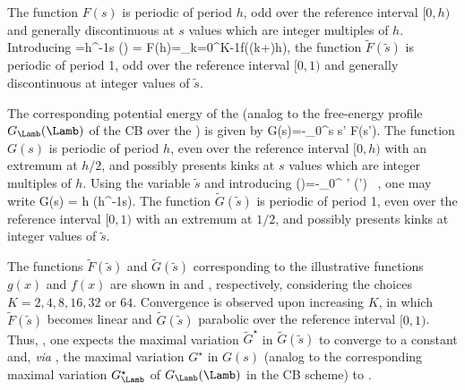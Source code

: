      
%
The function $F(s)$ is periodic of period $h$, odd over the reference interval $[0,h)$
and generally discontinuous at $s$ values which are integer multiples of $h$.
%
Introducing  
%
=h^{-1}s \quad{}\quad{}() = F(h)=\sum\limits_{k=0}^{K-1}f((k+)h),
\eeq
%
the function $\tilde{F}(\tilde{s})$ is periodic of period 1, odd over the reference interval $[0,1)$ and generally discontinuous at integer values of $\tilde{s}$.

The corresponding potential energy of the  (analog to the free-energy profile $G_{\Lamb}(\Lamb)$ of the CB 
over the ) is given by
%
G(s)=-\int\limits_{0}^{s} s' F(s').
\eeq
%
The function $G(s)$ is periodic of period $h$, even over the reference
interval $[0,h)$ with an extremum at $h/2$, and possibly presents kinks at $s$ values which are integer multiples of $h$.
%
Using the variable $\tilde{s}$ and introducing
%
()=-\int\limits_{0}^{} ' (') \ ,
\eeq
%
one may write
%
G(s) = h (h^{-1}s).
\eeq
%
The function $\tilde{G}(\tilde{s})$ is periodic of period 1, even over
the reference interval $[0,1)$ with an extremum at $1/2$,
and possibly presents kinks at integer values of $\tilde{s}$.

The functions $\tilde{F}(\tilde{s})$ and $\tilde{G}(\tilde{s})$
corresponding to the illustrative functions $g(x)$ and $f(x)$ are shown in  and , respectively, considering the choices $K=2,4,8,16,32$ or $64$.
%
Convergence is observed upon increasing $K$,
in which
$\tilde{F}(\tilde{s})$
becomes linear and $\tilde{G}(\tilde{s})$ parabolic over the reference interval
$[0,1)$. Thus, , one expects the maximal variation $\tilde{G}^\star$ in $\tilde{G}(\tilde{s})$
to converge to a constant and, \textit{via} , the maximal variation $G^\star$
in $G(s)$  (analog to the corresponding maximal variation $G_{\Lamb}^\star$ of  $G_{\Lamb}(\Lamb)$ in the CB scheme)
to .

